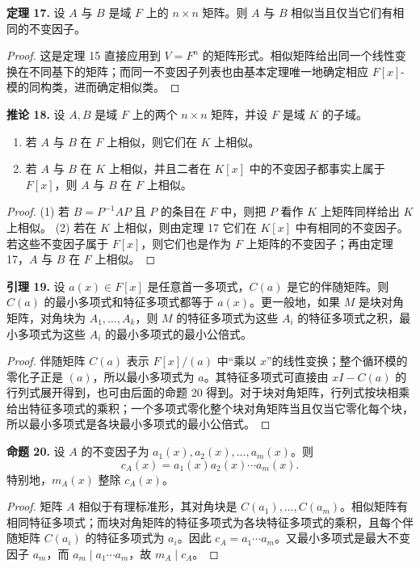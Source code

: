 \noindent\textbf{定理 17.} 设 $A$ 与 $B$ 是域 $F$ 上的 $n\times n$ 矩阵。则 $A$ 与 $B$ 相似当且仅当它们有相同的不变因子。

\begin{proof}
这是定理 15 直接应用到 $V=F^n$ 的矩阵形式。相似矩阵给出同一个线性变换在不同基下的矩阵；而同一不变因子列表也由基本定理唯一地确定相应 $F[x]$-模的同构类，进而确定相似类。
\end{proof}

\noindent\textbf{推论 18.} 设 $A,B$ 是域 $F$ 上的两个 $n\times n$ 矩阵，并设 $F$ 是域 $K$ 的子域。
\begin{enumerate}[label=(\arabic*)]
\item 若 $A$ 与 $B$ 在 $F$ 上相似，则它们在 $K$ 上相似。
\item 若 $A$ 与 $B$ 在 $K$ 上相似，并且二者在 $K[x]$ 中的不变因子都事实上属于 $F[x]$，则 $A$ 与 $B$ 在 $F$ 上相似。
\end{enumerate}

\begin{proof}
(1) 若 $B=P^{-1}AP$ 且 $P$ 的条目在 $F$ 中，则把 $P$ 看作 $K$ 上矩阵同样给出 $K$ 上相似。 (2) 若在 $K$ 上相似，则由定理 17 它们在 $K[x]$ 中有相同的不变因子。若这些不变因子属于 $F[x]$，则它们也是作为 $F$ 上矩阵的不变因子；再由定理 17，$A$ 与 $B$ 在 $F$ 上相似。
\end{proof}

\noindent\textbf{引理 19.} 设 $a(x)\in F[x]$ 是任意首一多项式，$C(a)$ 是它的伴随矩阵。则 $C(a)$ 的最小多项式和特征多项式都等于 $a(x)$。更一般地，如果 $M$ 是块对角矩阵，对角块为 $A_1,\ldots,A_k$，则 $M$ 的特征多项式为这些 $A_i$ 的特征多项式之积，最小多项式为这些 $A_i$ 的最小多项式的最小公倍式。

\begin{proof}
伴随矩阵 $C(a)$ 表示 $F[x]/(a)$ 中“乘以 $x$”的线性变换；整个循环模的零化子正是 $(a)$，所以最小多项式为 $a$。其特征多项式可直接由 $xI-C(a)$ 的行列式展开得到，也可由后面的命题 20 得到。对于块对角矩阵，行列式按块相乘给出特征多项式的乘积；一个多项式零化整个块对角矩阵当且仅当它零化每个块，所以最小多项式是各块最小多项式的最小公倍式。
\end{proof}

\noindent\textbf{命题 20.} 设 $A$ 的不变因子为 $a_1(x),a_2(x),\ldots,a_m(x)$。则
\[
c_A(x)=a_1(x)a_2(x)\cdots a_m(x).
\]
特别地，$m_A(x)$ 整除 $c_A(x)$。

\begin{proof}
矩阵 $A$ 相似于有理标准形，其对角块是 $C(a_1),\ldots,C(a_m)$。相似矩阵有相同特征多项式；而块对角矩阵的特征多项式为各块特征多项式的乘积，且每个伴随矩阵 $C(a_i)$ 的特征多项式为 $a_i$。因此 $c_A=a_1\cdots a_m$。又最小多项式是最大不变因子 $a_m$，而 $a_m\mid a_1\cdots a_m$，故 $m_A\mid c_A$。
\end{proof}


